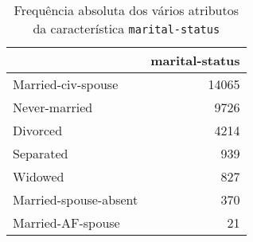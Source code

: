 \begin{table}
\centering
\caption{Frequência absoluta dos vários atributos da característica \texttt{marital-status}}
\begin{tabular}{lr}
\toprule
{} &  marital-status \\
\midrule
 Married-civ-spouse    &           14065 \\
 Never-married         &            9726 \\
 Divorced              &            4214 \\
 Separated             &             939 \\
 Widowed               &             827 \\
 Married-spouse-absent &             370 \\
 Married-AF-spouse     &              21 \\
\bottomrule
\end{tabular}
\end{table}
